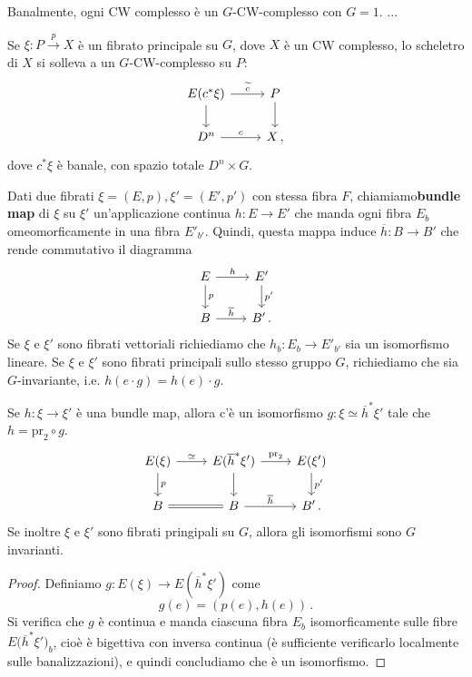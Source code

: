 \begin{oss}
	Banalmente, ogni CW complesso è un $G$-CW-complesso con $G=1$.
	...
\end{oss}

Se $\xi:P \xrightarrow{p} X$ è un fibrato principale su $G$, dove $X$ è un CW complesso,
lo scheletro di $X$ si solleva a un $G$-CW-complesso su $P$:
\begin{equation*}
	\begin{tikzcd}
		E(c^{*} \xi) \ar[r, "\widetilde{c}"] \ar[d] & P \ar[d] \\
		D^{n} \ar[r, "c"] & X\,,
	\end{tikzcd}
\end{equation*}
dove $c^{*}\xi$ è banale, con spazio totale $D^{n} \times G$.

\begin{df}
	Dati due fibrati $\xi = (E,p), \xi'=(E',p')$ con stessa fibra $F$,
	chiamiamo\textbf{bundle map} di $\xi$ su $\xi'$ un'applicazione continua
	$h:E \to E'$ che manda ogni fibra $E_{b}$ omeomorficamente in una fibra $E'_{b'}$.
	Quindi, questa mappa induce $\overline{h} : B \to B'$ che rende commutativo il diagramma
	\begin{equation*}
		\begin{tikzcd}
			E \ar[d, "p"] \ar[r, "h"] & E' \ar[d, "p'"] \\
			B \ar[r, "\overline{h}"] & B'\,.
		\end{tikzcd}
	\end{equation*}
	Se $\xi$ e $\xi'$ sono fibrati vettoriali richiediamo che
	$h_{b}:E_{b} \to E'_{b'}$ sia un isomorfismo lineare.
	Se $\xi$ e $\xi'$ sono fibrati principali sullo stesso gruppo $G$,
	richiediamo che sia $G$-invariante, i.e. $h(e \cdot g) = h(e) \cdot g$.
\end{df}

\begin{prop}
	Se $h:\xi \to \xi'$ è una bundle map,
	allora c'è un isomorfismo $g:\xi \simeq \overline{h}^{*}\xi'$
	tale che $h=\mathrm{pr}_{2} \circ g$.
	\begin{equation*}
		\begin{tikzcd}
			E(\xi) \ar[r, "\simeq"] \ar[d, "p"]
			& E(\overline{h}^{*}\xi') \ar[r, "\mathrm{pr}_{2}"] \ar[d]
			& E(\xi') \ar[d, "p'"] \\
			B \ar[r, equals] 
			& B \ar[r, "\overline{h}"]
			& B'\,.
		\end{tikzcd}
	\end{equation*}
	Se inoltre $\xi$ e $\xi'$ sono fibrati pringipali su $G$,
	allora gli isomorfismi sono $G$ invarianti.
	\begin{proof}
		Definiamo $g: E(\xi) \to E(\overline{h}^{*}\xi')$ come
		\begin{equation*}
			g(e) = \left( p(e), h(e) \right)\,.
		\end{equation*}
		Si verifica che $g$ è continua e manda ciascuna fibra $E_{b}$
		isomorficamente sulle fibre $E({\overline{h}^{*}\xi')_{b}}$,
		cioè è bigettiva con inversa continua (è sufficiente verificarlo
		localmente sulle banalizzazioni),
		e quindi concludiamo che è un isomorfismo.
	\end{proof}
\end{prop}

